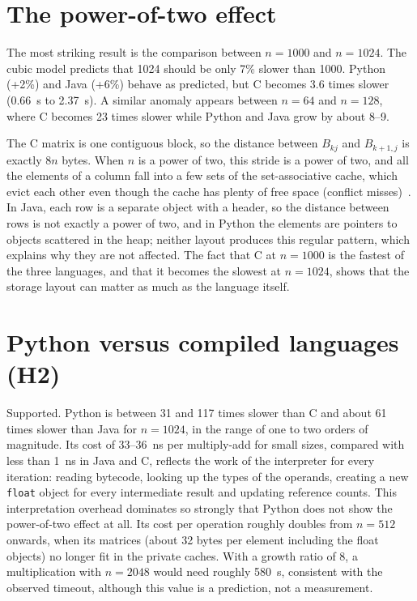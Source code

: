 \documentclass[12pt,a4paper]{report}
\begin{document}
\section{The power-of-two effect}

The most striking result is the comparison between $n = 1000$ and $n = 1024$. The cubic model predicts that 1024
should be only 7\% slower than 1000. Python (+2\%) and Java (+6\%) behave as predicted, but C becomes 3.6 times slower
(0.66~s to 2.37~s). A similar anomaly appears between $n = 64$ and $n = 128$, where C becomes 23 times slower while
Python and Java grow by about 8--9.

The C matrix is one contiguous block, so the distance between $B_{kj}$ and $B_{k+1,j}$ is exactly $8n$ bytes. When $n$
is a power of two, this stride is a power of two, and all the elements of a column fall into a few sets of the
set-associative cache, which evict each other even though the cache has plenty of free space (conflict
misses)~\cite{drepper2007,lam1991}. In Java, each row is a separate object with a header, so the distance between rows
is not exactly a power of two, and in Python the elements are pointers to objects scattered in the heap; neither layout
produces this regular pattern, which explains why they are not affected. The fact that C at $n = 1000$ is the fastest
of the three languages, and that it becomes the slowest at $n = 1024$, shows that the storage layout can matter as much
as the language itself.

\section{Python versus compiled languages (H2)}

Supported. Python is between 31 and 117 times slower than C and about 61 times slower than Java for $n = 1024$, in the
range of one to two orders of magnitude. Its cost of 33--36~ns per multiply-add for small sizes, compared with less
than 1~ns in Java and C, reflects the work of the interpreter for every iteration: reading bytecode, looking up the
types of the operands, creating a new \texttt{float} object for every intermediate result and updating reference
counts. This interpretation overhead dominates so strongly that Python does not show the power-of-two effect at all.
Its cost per operation roughly doubles from $n = 512$ onwards, when its matrices (about 32 bytes per element including
the float objects) no longer fit in the private caches. With a growth ratio of 8, a multiplication with $n = 2048$ would
need roughly 580~s, consistent with the observed timeout, although this value is a prediction, not a measurement.
\end{document}

